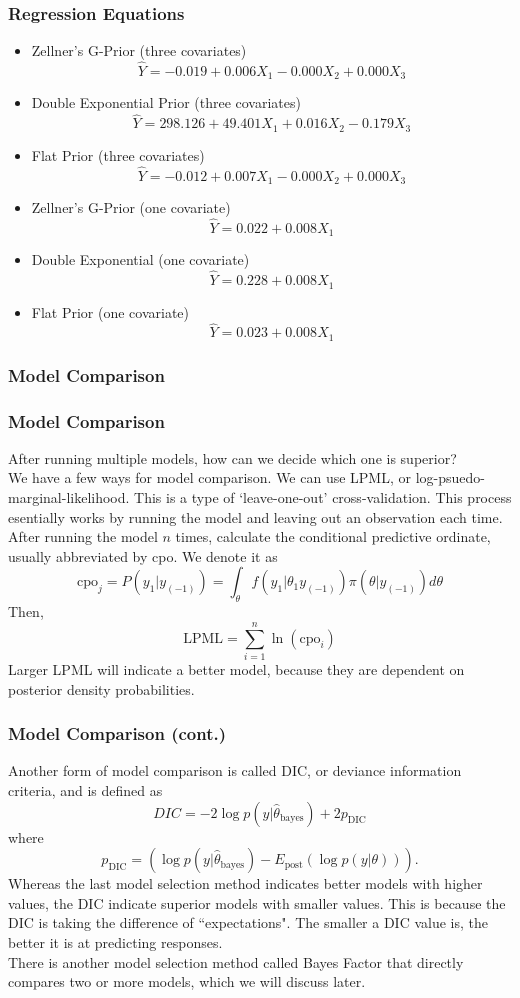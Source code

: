 \documentclass[10pt]{beamer}
\begin{document}
\begin{frame}
\frametitle{Regression Equations}
	\begin{itemize}
		\item Zellner's G-Prior (three covariates) $$\hat{Y}=-0.019+0.006X_1-0.000X_2+0.000X_3$$
		\item Double Exponential Prior (three covariates) $$\hat{Y}=298.126+49.401X_1+0.016X_2-0.179X_3$$
		\item Flat Prior (three covariates) $$\hat{Y}=-0.012+0.007X_1-0.000X_2+0.000X_3$$
		\item Zellner's G-Prior (one covariate) $$\hat{Y}=0.022+0.008X_1$$
		\item Double Exponential (one covariate) $$\hat{Y}=0.228+0.008X_1$$
		\item Flat Prior (one covariate) $$\hat{Y}=0.023+0.008X_1$$
	\end{itemize}
\end{frame}

\subsubsection{Model Comparison}
\begin{frame}
\frametitle{Model Comparison}
	After running multiple models, how can we decide which one is superior?\\[2mm]
	We have a few ways for model comparison. We can use LPML, or log-psuedo-marginal-likelihood. This is a type of `leave-one-out' cross-validation. This process esentially works by running the model and leaving out an observation each time. After running the model $n$ times, calculate the conditional predictive ordinate, usually abbreviated by cpo. We denote it as $$\text{cpo}_j=P\left(y_1|y_{(-1)}\right)=\int_{\theta}f\left(y_1|\theta_1y_{(-1)}\right)\pi\left(\theta|y_{(-1)}\right)d\theta$$ Then, $$\text{LPML}=\sum_{i=1}^n\ln(\text{cpo}_i)$$ Larger LPML will indicate a better model, because they are dependent on posterior density probabilities.
\end{frame}

\begin{frame}
\frametitle{Model Comparison (cont.)}
	Another form of model comparison is called DIC, or deviance information criteria, and is defined as $$DIC=-2\log p\left(y|\hat{\theta}_{\text{bayes}}\right)+2p_{\text{DIC}}$$ where $$p_{\text{DIC}}=\left(\log p\left(y|\hat{\theta}_{\text{bayes}}\right)-E_{\text{post}}\left(\log p(y|\theta)\right)\right).$$ Whereas the last model selection method indicates better models with higher values, the DIC indicate superior models with smaller values. This is because the DIC is taking the difference of ``expectations". The smaller a DIC value is, the better it is at predicting responses.\\[2mm]
	There is another model selection method called Bayes Factor that directly compares two or more models, which we will discuss later.
\end{frame}
\end{document}
